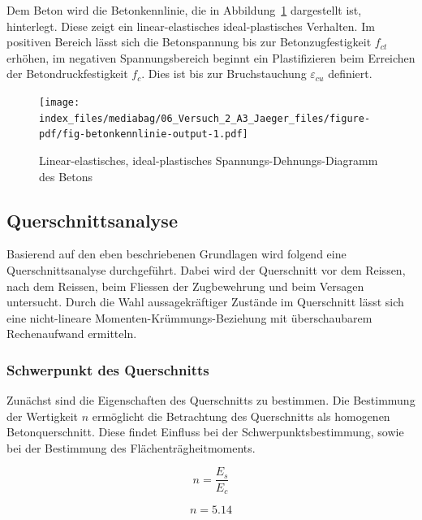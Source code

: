 \documentclass[
  12pt,
  letterpaper,
  egregdoesnotlikesansseriftitles]{scrreprt}
\begin{document}
Dem Beton wird die Betonkennlinie, die in
Abbildung~\ref{fig-betonkennlinie} dargestellt ist, hinterlegt. Diese
zeigt ein linear-elastisches ideal-plastisches Verhalten. Im positiven
Bereich lässt sich die Betonspannung bis zur Betonzugfestigkeit
\(f_{ct}\) erhöhen, im negativen Spannungsbereich beginnt ein
Plastifizieren beim Erreichen der Betondruckfestigkeit \(f_c\). Dies ist
bis zur Bruchstauchung \(\varepsilon_{cu}\) definiert.

\begin{figure}[H]

{\centering \texttt{[image: index\_files/mediabag/06\_Versuch\_2\_A3\_Jaeger\_files/figure-pdf/fig-betonkennlinie-output-1.pdf]}

}

\caption{\label{fig-betonkennlinie}Linear-elastisches, ideal-plastisches
Spannungs-Dehnungs-Diagramm des Betons}

\end{figure}

\hypertarget{querschnittsanalyse}{%
\subsection{Querschnittsanalyse}\label{querschnittsanalyse}}

Basierend auf den eben beschriebenen Grundlagen wird folgend eine
Querschnittsanalyse durchgeführt. Dabei wird der Querschnitt vor dem
Reissen, nach dem Reissen, beim Fliessen der Zugbewehrung und beim
Versagen untersucht. Durch die Wahl aussagekräftiger Zustände im
Querschnitt lässt sich eine nicht-lineare Momenten-Krümmungs-Beziehung
mit überschaubarem Rechenaufwand ermitteln.

\hypertarget{schwerpunkt-des-querschnitts}{%
\subsubsection{Schwerpunkt des
Querschnitts}\label{schwerpunkt-des-querschnitts}}

Zunächst sind die Eigenschaften des Querschnitts zu bestimmen. Die
Bestimmung der Wertigkeit \(n\) ermöglicht die Betrachtung des
Querschnitts als homogenen Betonquerschnitt. Diese findet Einfluss bei
der Schwerpunktsbestimmung, sowie bei der Bestimmung des
Flächenträgheitmoments.

\begin{equation}n = \frac{E_{s}}{E_{c}}\end{equation}

\begin{equation}n = 5.14\end{equation}
\end{document}
